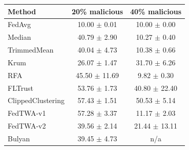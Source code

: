 \begin{tabular}{lcc}
\toprule
Method & 20\% malicious & 40\% malicious \\
\midrule
FedAvg & 10.00 $\pm$ 0.01 & 10.00 $\pm$ 0.00 \\
Median & 40.79 $\pm$ 2.90 & 10.27 $\pm$ 0.40 \\
TrimmedMean & 40.04 $\pm$ 4.73 & 10.38 $\pm$ 0.66 \\
Krum & 26.07 $\pm$ 1.47 & 31.70 $\pm$ 6.26 \\
RFA & 45.50 $\pm$ 11.69 & 9.82 $\pm$ 0.30 \\
FLTrust & 53.76 $\pm$ 1.73 & 40.80 $\pm$ 22.40 \\
ClippedClustering & 57.43 $\pm$ 1.51 & 50.53 $\pm$ 5.14 \\
FedTWA-v1 & 57.28 $\pm$ 3.37 & 11.17 $\pm$ 2.03 \\
FedTWA-v2 & 39.56 $\pm$ 2.14 & 21.44 $\pm$ 13.11 \\
Bulyan & 39.45 $\pm$ 4.73 & n/a \\
\bottomrule
\end{tabular}